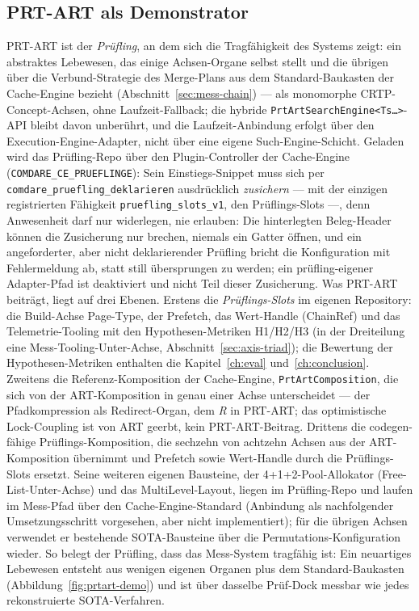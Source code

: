 \begin{nurlang}
\section{PRT-ART als Demonstrator}\label{sec:prtart-demo}
PRT-ART ist der \emph{Prüfling}, an dem sich die Tragfähigkeit des Systems zeigt: ein abstraktes Lebewesen, das einige
Achsen-Organe selbst stellt und die übrigen über die Verbund-Strategie des Merge-Plans aus dem
Standard-Baukasten der Cache-Engine bezieht (Abschnitt~\ref{sec:mess-chain}) --- als monomorphe
CRTP-Concept-Achsen, ohne Laufzeit-Fallback; die hybride
\texttt{PrtArtSearchEngine<Ts\ldots>}-API bleibt davon unberührt, und die Laufzeit-Anbindung erfolgt über
den Execution-Engine-Adapter, nicht über eine eigene Such-Engine-Schicht. Geladen wird das
Prüfling-Repo über den Plugin-Controller der Cache-Engine
(\texttt{COMDARE\_\allowbreak{}CE\_\allowbreak{}PRUEFLINGE}): Sein Einstiegs-Snippet muss sich per
\texttt{comdare\_\allowbreak{}pruefling\_\allowbreak{}deklarieren} ausdrücklich \emph{zusichern} ---
mit der einzigen registrierten Fähigkeit
\texttt{pruefling\_\allowbreak{}slots\_\allowbreak{}v1}, den Prüflings-Slots ---, denn
Anwesenheit darf nur widerlegen, nie erlauben: Die hinterlegten Beleg-Header können die Zusicherung
nur brechen, niemals ein Gatter öffnen, und ein angeforderter, aber nicht deklarierender Prüfling
bricht die Konfiguration mit Fehlermeldung ab, statt still übersprungen zu werden; ein prüfling-eigener
Adapter-Pfad ist deaktiviert und nicht Teil dieser Zusicherung.
Was PRT-ART beiträgt, liegt auf drei Ebenen. Erstens die \emph{Prüflings-Slots} im eigenen Repository:
die Build-Achse Page-Type, der Prefetch, das Wert-Handle (ChainRef) und das Telemetrie-Tooling mit den
Hypothesen-Metriken H1/H2/H3 (in der Dreiteilung eine Mess-Tooling-Unter-Achse,
Abschnitt~\ref{sec:axis-triad}); die Bewertung der Hypothesen-Metriken enthalten die
Kapitel~\ref{ch:eval} und~\ref{ch:conclusion}. Zweitens die Referenz-Komposition der Cache-Engine,
\texttt{PrtArtComposition}, die sich von der ART-Komposition in genau einer Achse unterscheidet --- der
Pfadkompression als Redirect-Organ, dem \emph{R} in PRT-ART\@; das optimistische Lock-Coupling ist von
ART geerbt, kein PRT-ART-Beitrag. Drittens die codegen-fähige Prüflings-Komposition, die sechzehn von
achtzehn Achsen aus der ART-Komposition übernimmt und Prefetch sowie Wert-Handle durch die
Prüflings-Slots ersetzt. Seine weiteren eigenen Bausteine, der 4+1+2-Pool-Allokator
(Free-List-Unter-Achse) und das MultiLevel-Layout, liegen im Prüfling-Repo und laufen im Mess-Pfad über
den Cache-Engine-Standard (Anbindung als nachfolgender Umsetzungsschritt vorgesehen, aber nicht
implementiert); für die übrigen Achsen verwendet er bestehende
SOTA-Bausteine über die Permutations-Konfiguration wieder. So belegt der Prüfling, dass das Mess-System
tragfähig ist: Ein neuartiges Lebewesen entsteht aus wenigen eigenen Organen plus dem Standard-Baukasten
(Abbildung~\ref{fig:prtart-demo}) und ist über dasselbe Prüf-Dock messbar wie jedes rekonstruierte
SOTA-Verfahren.


\end{nurlang}
